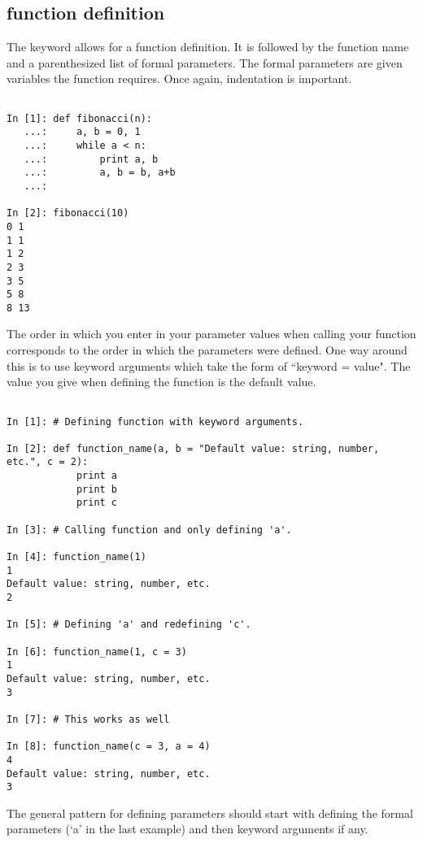 \subsection*{function definition}
\begin{example}

The  keyword allows for a function definition. It is followed by 
the function name and a parenthesized list of formal parameters.
The formal parameters are given variables the function requires. 
Once again, indentation is important. 

\begin{lstlisting}

In [1]: def fibonacci(n):
   ...:     a, b = 0, 1
   ...:     while a < n:
   ...:         print a, b
   ...:         a, b = b, a+b
   ...:         

In [2]: fibonacci(10)
0 1
1 1
1 2
2 3
3 5
5 8
8 13

\end{lstlisting}

The order in which you enter in your parameter values when calling your function corresponds to the order in which the parameters were defined. One way around this is to use keyword arguments which take the form of ``keyword = value". The value you give when defining the function is the default value.

\begin{lstlisting}

In [1]: # Defining function with keyword arguments.

In [2]: def function_name(a, b = "Default value: string, number, etc.", c = 2):
    		print a
    		print b
    		print c

In [3]: # Calling function and only defining 'a'.

In [4]: function_name(1)
1
Default value: string, number, etc.
2

In [5]: # Defining 'a' and redefining 'c'.

In [6]: function_name(1, c = 3)
1
Default value: string, number, etc.
3

In [7]: # This works as well

In [8]: function_name(c = 3, a = 4)
4
Default value: string, number, etc.
3

\end{lstlisting}

The general pattern for defining parameters should start with defining the formal parameters (`a' in the last example) and then keyword arguments if any.


\end{example}
